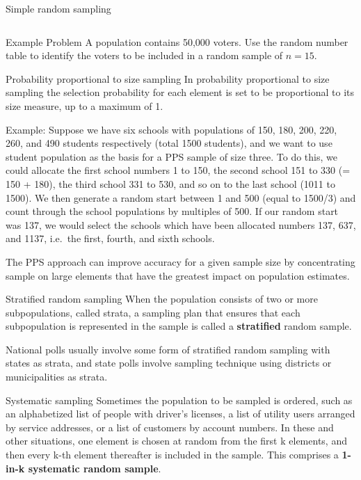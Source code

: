 \documentclass[
  ignorenonframetext,
  aspectratio=169]{beamer}
\begin{document}
\begin{frame}{Simple random sampling}
\begin{columns}[T,onlytextwidth]
\end{columns}
\end{frame}

\begin{frame}{Example Problem}
\protect\hypertarget{example-problem}{}
A population contains 50,000 voters. Use the random number table to
identify the voters to be included in a random sample of \(n=15\).
\end{frame}

\begin{frame}{Probability proportional to size sampling}
\protect\hypertarget{probability-proportional-to-size-sampling}{}
In probability proportional to size sampling the selection probability
for each element is set to be proportional to its size measure, up to a
maximum of 1.

Example: Suppose we have six schools with populations of 150, 180, 200,
220, 260, and 490 students respectively (total 1500 students), and we
want to use student population as the basis for a PPS sample of size
three. To do this, we could allocate the first school numbers 1 to 150,
the second school 151 to 330 (= 150 + 180), the third school 331 to 530,
and so on to the last school (1011 to 1500). We then generate a random
start between 1 and 500 (equal to 1500/3) and count through the school
populations by multiples of 500. If our random start was 137, we would
select the schools which have been allocated numbers 137, 637, and 1137,
i.e.~the first, fourth, and sixth schools.

The PPS approach can improve accuracy for a given sample size by
concentrating sample on large elements that have the greatest impact on
population estimates.
\end{frame}

\begin{frame}{Stratified random sampling}
\protect\hypertarget{stratified-random-sampling}{}
When the population consists of two or more subpopulations, called
strata, a sampling plan that ensures that each subpopulation is
represented in the sample is called a \textbf{stratified} random sample.

National polls usually involve some form of stratified random sampling
with states as strata, and state polls involve sampling technique using
districts or municipalities as strata.
\end{frame}

\begin{frame}{Systematic sampling}
\protect\hypertarget{systematic-sampling}{}
Sometimes the population to be sampled is ordered, such as an
alphabetized list of people with driver's licenses, a list of utility
users arranged by service addresses, or a list of customers by account
numbers. In these and other situations, one element is chosen at random
from the first k elements, and then every k-th element thereafter is
included in the sample. This comprises a \textbf{1-in-k systematic
random sample}.
\end{frame}
\end{document}
